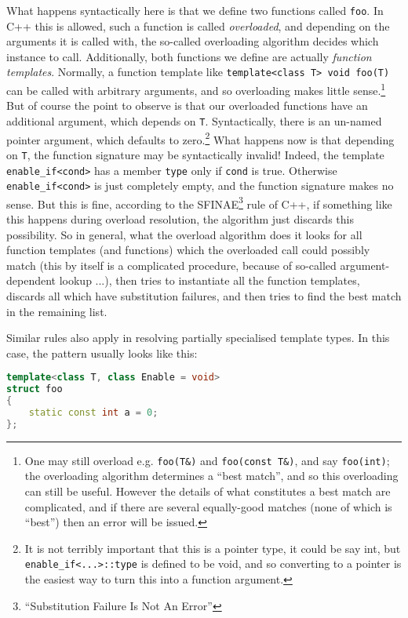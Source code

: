 \documentclass[a4paper,10pt]{book}
\newcommand{\code}{\lstinline}
\begin{document}
{{What happens syntactically here is that we define two functions called
\code{foo}. In C++ this is allowed, such a function is called \emph{overloaded},
and depending on the arguments it is called with, the so-called overloading
algorithm decides which instance to call. Additionally, both functions we define
are actually \emph{function templates}. Normally, a function template like
\code{template<class T> void foo(T)} can be called with arbitrary
arguments, and so overloading makes little sense.\footnote{One may still overload
e.g. \code{foo(T&)} and \code{foo(const T&)}, and say \code{foo(int)}; the
overloading algorithm determines a ``best match'', and so this overloading can
still be useful. However the details of what constitutes a best match are
complicated, and if there are several equally-good matches (none of which is
``best'') then an error will be issued.} But of course the point to observe is
that our overloaded functions have an additional argument, which depends on
\code{T}. Syntactically, there is an un-named pointer argument, which defaults
to zero.\footnote{It is not terribly important that this is a pointer type, it
could be say int, but \code{enable_if<...>::type} is defined to be void, and so
converting to a pointer is the easiest way to turn this into a function
argument.} What happens now is that depending on \code{T}, the function
signature may be syntactically invalid! Indeed, the template
\code{enable_if<cond>} has a member \code{type} only if \code{cond} is true.
Otherwise \code{enable_if<cond>} is just completely empty, and the function
signature makes no sense. But this is fine, according to the
SFINAE\footnote{``Substitution Failure Is Not An Error''} rule of C++, if
something like this happens during overload resolution, the algorithm just
discards this possibility. So in general, what the overload algorithm does it
looks for all function templates (and functions) which the overloaded call could
possibly match (this by itself is a complicated procedure, because of so-called
argument-dependent lookup ...), then tries to instantiate all the function
templates, discards all which have substitution failures, and then tries to find
the best match in the remaining list.

Similar rules also apply in resolving partially specialised template types. In
this case, the pattern usually looks like this:

\begin{lstlisting}[language=c++]
template<class T, class Enable = void>
struct foo
{
    static const int a = 0;
};


\end{lstlisting}}}
\end{document}
